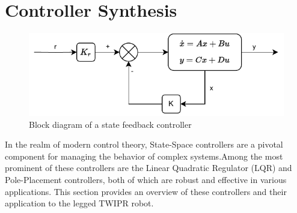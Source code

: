 \section{Controller Synthesis}

\begin{figure}[h]
	\centering
	\includegraphics[width=.5\textwidth]{Block Diagram of State Feedback Controller}
	\caption{Block diagram of a state feedback controller}
	\label{fig:Block diagram of a state feedback controller}
\end{figure}


In the realm of modern control theory, State-Space controllers are a pivotal component for managing the behavior of complex systems.Among the most prominent of these controllers are the Linear Quadratic Regulator (LQR) and Pole-Placement controllers, both of which are robust and effective in various applications.
This section provides an overview of these controllers and their application to the legged TWIPR robot.

